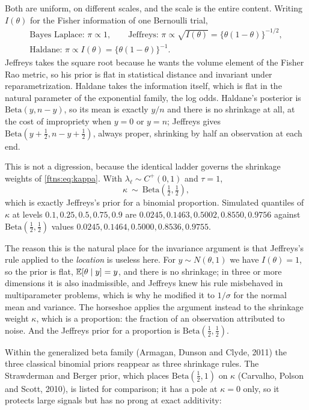 Both are uniform, on different scales, and the scale is the entire content. Writing $I(\theta)$ for
the Fisher information of one Bernoulli trial,
\begin{gather*}
\text{Bayes Laplace: } \pi\propto1,
\qquad
\text{Jeffreys: } \pi\propto\sqrt{I(\theta)}=\{\theta(1-\theta)\}^{-1/2},
\\
\text{Haldane: } \pi\propto I(\theta)=\{\theta(1-\theta)\}^{-1}.
\end{gather*}
Jeffreys takes the square root because he wants the volume element of the Fisher Rao metric, so
his prior is flat in statistical distance and invariant under reparametrization. Haldane takes the
information itself, which is flat in the natural parameter of the exponential family, the log odds.
Haldane's posterior is $\text{Beta}(y,n-y)$, so its mean is exactly $y/n$ and there is no shrinkage
at all, at the cost of impropriety when $y=0$ or $y=n$; Jeffreys gives
$\text{Beta}(y+\tfrac12,n-y+\tfrac12)$, always proper, shrinking by half an observation at each end.

\label{ftns:sec:ladder}

This is not a digression, because the identical ladder governs the shrinkage weights of
\eqref{ftns:eq:kappa}. With $\lambda_\ell\sim C^+(0,1)$ and $\tau=1$,
\[
\kappa\ \sim\ \text{Beta}(\tfrac12,\tfrac12),
\]
which is exactly Jeffreys's prior for a binomial proportion. Simulated quantiles of $\kappa$ at
levels $0.1,0.25,0.5,0.75,0.9$ are $0.0245,0.1463,0.5002,0.8550,0.9756$ against
$\text{Beta}(\tfrac12,\tfrac12)$ values $0.0245,0.1464,0.5000,0.8536,0.9755$.

The reason this is the natural place for the invariance argument is that Jeffreys's rule applied to
the \emph{location} is useless here. For $y\sim N(\theta,1)$ we have $I(\theta)=1$, so the prior is
flat, $\mathbb{E}[\theta\mid y]=y$, and there is no shrinkage; in three or more dimensions it is also
inadmissible, and Jeffreys knew his rule misbehaved in multiparameter problems, which is why he
modified it to $1/\sigma$ for the normal mean and variance. The horseshoe applies the argument
instead to the shrinkage weight $\kappa$, which is a proportion: the fraction of an observation
attributed to noise. And the Jeffreys prior for a proportion is $\text{Beta}(\tfrac12,\tfrac12)$.

Within the generalized beta family (Armagan, Dunson and Clyde, 2011) the three classical binomial
priors reappear as three shrinkage rules. The Strawderman and Berger prior, which places
$\text{Beta}(\tfrac12,1)$ on $\kappa$ (Carvalho, Polson and Scott, 2010), is listed for comparison;
it has a pole at $\kappa=0$ only, so it protects large signals but has no prong at exact
additivity:

